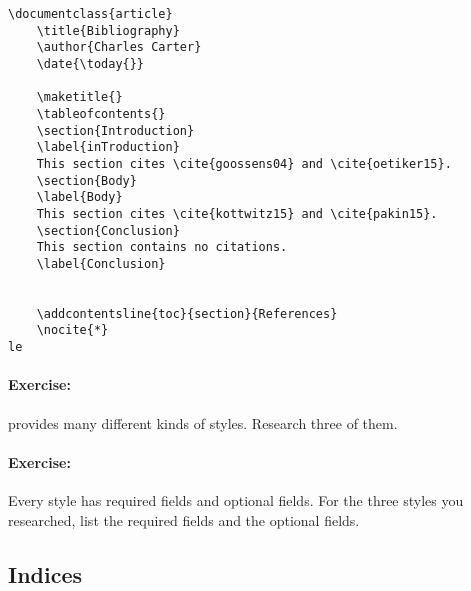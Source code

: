         \begin{verbatim}
\documentclass{article}
    \title{Bibliography}
    \author{Charles Carter}
    \date{\today{}}
 
    \maketitle{}
    \tableofcontents{}
    \section{Introduction}
    \label{inTroduction}
    This section cites \cite{goossens04} and \cite{oetiker15}.
    \section{Body}
    \label{Body}
    This section cites \cite{kottwitz15} and \cite{pakin15}.
    \section{Conclusion}
    This section contains no citations.
    \label{Conclusion}
        
    
    \addcontentsline{toc}{section}{References}
    \nocite{*}
le
        \end{verbatim}

        \paragraph{Exercise:} \bib provides many different kinds of styles. Research three of them.

        \paragraph{Exercise:} Every style has required fields and optional fields. For the three styles you researched, list the required fields and the optional fields.

    \subsection{Indices}
    \label{Indices}

